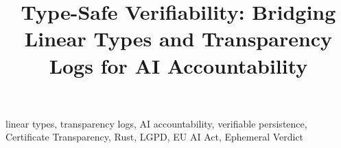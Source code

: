 \documentclass[conference]{IEEEtran}
\begin{document}
\title{Type-Safe Verifiability: Bridging Linear Types and Transparency Logs
       for AI Accountability}

\author{
}

\maketitle

\begin{abstract}

\end{abstract}

\begin{IEEEkeywords}
linear types, transparency logs, AI accountability, verifiable persistence,
Certificate Transparency, Rust, LGPD, EU AI Act, Ephemeral Verdict
\end{IEEEkeywords}












\end{document}
